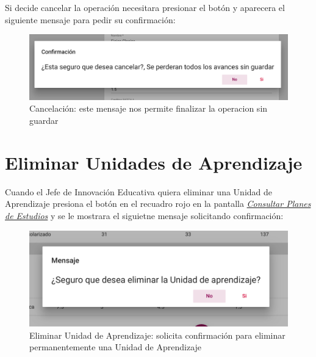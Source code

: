 Si decide cancelar la operación necesitara presionar el botón  y aparecera el siguiente mensaje para pedir su confirmación:\\
\begin{figure}[!hbtp]
    \centering
    \hypertarget{cancelarE}{\includegraphics[width=0.7\linewidth]{images/GUA/cancelar}}
    \caption{Cancelación: este mensaje nos permite finalizar la operacion sin guardar}
    \label{cancelarE}
\end{figure}
\newpage
\section{Eliminar Unidades de Aprendizaje}
Cuando el Jefe de Innovación Educativa quiera eliminar una Unidad de Aprendizaje presiona el botón  en el recuadro rojo en la pantalla \hyperlink{consultarUA}{\textit{Consultar Planes de Estudios}} y se le mostrara el siguietne mensaje solicitando confirmación:\\
\begin{figure}[!hbtp]
    \centering
    \hypertarget{EliminarUA}{\includegraphics[width=0.7\linewidth]{images/GUA/EliminarUA}}
    \caption{Eliminar Unidad de Aprendizaje: solicita confirmación para eliminar permanentemente una Unidad de Aprendizaje}
    \label{EliminarUA}
\end{figure}